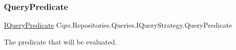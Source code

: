 \subsubsection{\texorpdfstring{Query\+Predicate}{QueryPredicate}}
{\footnotesize\ttfamily \hyperlink{interfaceCqrs_1_1Repositories_1_1Queries_1_1IQueryPredicate}{I\+Query\+Predicate} Cqrs.\+Repositories.\+Queries.\+I\+Query\+Strategy.\+Query\+Predicate\hspace{0.3cm}{\ttfamily [get]}}



The predicate that will be evaluated. 

